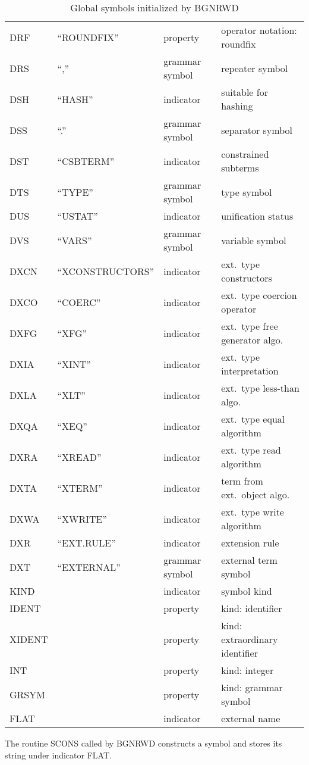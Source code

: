 \begin{table}
\begin{center}
\begin{tabular}{|l|l|l|l|}
  DRF        & ``ROUNDFIX'' & property       & operator notation: roundfix \\
  DRS        & ``,''      & grammar symbol & repeater symbol \\    
  DSH        & ``HASH''   & indicator      & suitable for hashing \\
  DSS        & ``.''      & grammar symbol & separator symbol \\     
  DST        & ``CSBTERM'' & indicator     & constrained subterms \\
  DTS        & ``TYPE''   & grammar symbol & type symbol \\      
  DUS        & ``USTAT''  & indicator      & unification status \\
  DVS        & ``VARS''   & grammar symbol & variable symbol \\      
  DXCN       & ``XCONSTRUCTORS'' & indicator & ext.\ type constructors \\
  DXCO       & ``COERC''  & indicator      & ext.\ type coercion operator \\
  DXFG       & ``XFG''    & indicator      & ext.\ type free generator algo. \\
  DXIA       & ``XINT''   & indicator      & ext.\ type interpretation \\
  DXLA       & ``XLT''    & indicator      & ext.\ type less-than algo. \\
  DXQA       & ``XEQ''    & indicator      & ext.\ type equal algorithm \\
  DXRA       & ``XREAD''  & indicator      & ext.\ type read algorithm \\
  DXTA       & ``XTERM''  & indicator      & term from ext.\ object algo. \\
  DXWA       & ``XWRITE'' & indicator      & ext.\ type write algorithm \\
  DXR        & ``EXT.RULE'' & indicator    & extension rule \\
  DXT        & ``EXTERNAL'' & grammar symbol & external term symbol \\
  KIND       &            & indicator      & symbol kind \\
  IDENT      &            & property       & kind: identifier \\
  XIDENT     &            & property       & kind: extraordinary identifier \\
  INT        &            & property       & kind: integer \\
  GRSYM      &            & property       & kind: grammar symbol \\
  FLAT       &            & indicator      & external name \\
  \hline
\end{tabular}
\caption{Global symbols initialized by BGNRWD} \label{tb:sym}
\end{center}
\end{table}

The routine SCONS called by BGNRWD constructs a symbol and stores its
string under indicator FLAT.